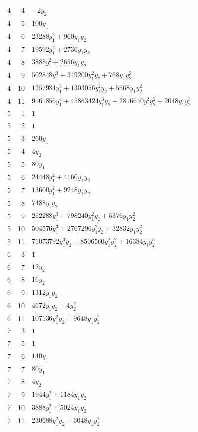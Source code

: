 \documentclass[10pt,a4paper]{article}
\begin{document}
{\begin{longtable}{rrp{125mm}}
4 & 4 & $- 2 y_{2}$\\
4 & 5 & $100 y_{1}$\\
4 & 6 & $23288 y_{1}^{2} + 960 y_{1} y_{2}$\\
4 & 7 & $19592 y_{1}^{2} + 2736 y_{1} y_{2}$\\
4 & 8 & $3888 y_{1}^{2} + 2656 y_{1} y_{2}$\\
4 & 9 & $502848 y_{1}^{3} + 349200 y_{1}^{2} y_{2} + 768 y_{1} y_{2}^{2}$\\
4 & 10 & $1257984 y_{1}^{3} + 1303056 y_{1}^{2} y_{2} + 5568 y_{1} y_{2}^{2}$\\
4 & 11 & $9161856 y_{1}^{4} + 45863424 y_{1}^{3} y_{2} + 2816640 y_{1}^{2} y_{2}^{2} + 2048 y_{1} y_{2}^{3}$\\
5 & 1 & $1$\\
5 & 2 & $1$\\
5 & 3 & $260 y_{1}$\\
5 & 4 & $4 y_{2}$\\
5 & 5 & $80 y_{1}$\\
5 & 6 & $24448 y_{1}^{2} + 4160 y_{1} y_{2}$\\
5 & 7 & $13600 y_{1}^{2} + 9248 y_{1} y_{2}$\\
5 & 8 & $7488 y_{1} y_{2}$\\
5 & 9 & $252288 y_{1}^{3} + 798240 y_{1}^{2} y_{2} + 5376 y_{1} y_{2}^{2}$\\
5 & 10 & $504576 y_{1}^{3} + 2767296 y_{1}^{2} y_{2} + 32832 y_{1} y_{2}^{2}$\\
5 & 11 & $71073792 y_{1}^{3} y_{2} + 8506560 y_{1}^{2} y_{2}^{2} + 16384 y_{1} y_{2}^{3}$\\
6 & 3 & $1$\\
6 & 7 & $12 y_{2}$\\
6 & 8 & $16 y_{2}$\\
6 & 9 & $1312 y_{1} y_{2}$\\
6 & 10 & $4672 y_{1} y_{2} + 4 y_{2}^{2}$\\
6 & 11 & $107136 y_{1}^{2} y_{2} + 9648 y_{1} y_{2}^{2}$\\
7 & 3 & $1$\\
7 & 5 & $1$\\
7 & 6 & $140 y_{1}$\\
7 & 7 & $80 y_{1}$\\
7 & 8 & $4 y_{2}$\\
7 & 9 & $1944 y_{1}^{2} + 1184 y_{1} y_{2}$\\
7 & 10 & $3888 y_{1}^{2} + 5024 y_{1} y_{2}$\\
7 & 11 & $230688 y_{1}^{2} y_{2} + 6048 y_{1} y_{2}^{2}$\\

\end{longtable}}
\end{document}
